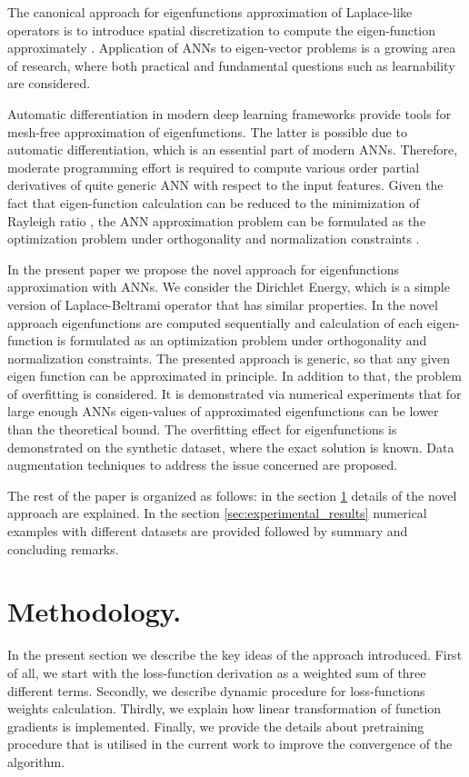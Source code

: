 \documentclass{article}
\theoremstyle{plain}
\theoremstyle{definition}
\theoremstyle{remark}
\begin{document}
The canonical approach for eigenfunctions approximation of Laplace-like operators is to introduce spatial discretization
to compute the eigen-function approximately \citet{doi:10.1080/00207179508921586}.
Application of ANNs to eigen-vector problems is a growing area of research,
where both practical \citet{fermionic_neural_network_states, LAGARIS19971}  and fundamental questions
such as learnability \citet{simon2022neural, 10.1162/neco_a_01583} are considered.

Automatic differentiation in modern deep learning frameworks provide tools for mesh-free approximation of eigenfunctions.
The latter is possible due to automatic differentiation, which is an essential part of modern ANNs.
Therefore, moderate programming effort is required to compute various order partial derivatives of quite generic
ANN with respect to the input features.
Given the fact that eigen-function calculation can be reduced to the minimization of Rayleigh ratio \citet{Feld_2019},
the ANN approximation problem can be formulated as
the optimization problem under orthogonality and normalization constraints \citet{pmlr-v162-deng22b}.


In the present paper we propose the novel approach for eigenfunctions approximation with ANNs.
We consider the Dirichlet Energy, which is a simple version of Laplace-Beltrami operator that has similar properties.
In the novel approach eigenfunctions are computed sequentially and calculation of each eigen-function is
formulated as an optimization problem under orthogonality and normalization constraints.
The presented approach is generic, so that any given eigen function can be approximated in principle.
In addition to that, the problem of overfitting is considered. It is demonstrated via numerical experiments that
for large enough ANNs eigen-values of approximated eigenfunctions can be lower than the theoretical bound.
The overfitting effect for eigenfunctions is demonstrated on the synthetic dataset, where the exact solution is known.
Data augmentation techniques to address the issue concerned are proposed.

The rest of the paper is organized as follows: in the section \ref{sec:methodology} details of the novel approach are explained.
In the section \ref{sec:experimental_results} numerical examples with different datasets are provided followed by summary and concluding remarks.


\section{Methodology.}
\label{sec:methodology}
In the present section we describe the key ideas of the approach introduced.
First of all, we start with the loss-function derivation as a weighted sum of three different terms.
Secondly, we describe dynamic procedure for loss-functions weights calculation.
Thirdly, we explain how linear transformation of function gradients is implemented.
Finally, we provide the details about pretraining procedure that is utilised in the current work to
improve the convergence of the algorithm.
\end{document}
